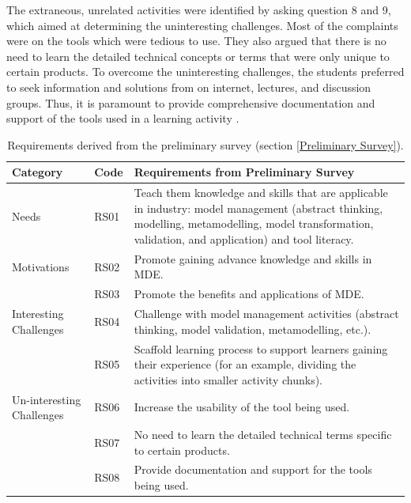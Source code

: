 \documentclass[12pt, a4paper]{report}
\begin{document}
The extraneous, unrelated activities were identified by asking question 8 and 9, which aimed at determining the uninteresting challenges. Most of the complaints were on the tools which were tedious to use. They also argued that there is no need to learn the detailed technical concepts or terms that were only unique to certain products. To overcome the uninteresting challenges, the students preferred to seek information and solutions from on internet, lectures, and discussion groups. Thus, it is paramount to provide comprehensive documentation and support of the tools used in a learning activity \cite{liebel2015ready}. 

\begin{table}[ht]
\caption{Requirements derived from the preliminary survey (section \ref{Preliminary Survey}).}
\label{table:preliminary-survey}
\begin{center}
\begin{tabular}{ p{2cm}p{1cm}p{10cm} } 
\hline
Category & Code & Requirements from Preliminary Survey \\
\hline
\multirow{1}{2cm}{Needs} 
& RS01 & Teach them knowledge and skills that are applicable in industry: model management (abstract thinking, modelling, metamodelling, model transformation, validation, and application) and tool literacy. \\ 
\hline
\multirow{1}{2cm}{Motivations}
& RS02 & Promote gaining advance knowledge and skills in MDE. \\ 
& RS03 & Promote the benefits and applications of MDE. \\ 
\hline
\multirow{1}{2cm}{Interesting Challenges}
& RS04 & Challenge with model management activities (abstract thinking, model validation, metamodelling, etc.). \\ 
& RS05 & Scaffold learning process to support learners gaining their experience (for an example, dividing the activities into smaller activity chunks). \\ 
\hline
\multirow{1}{2cm}{Un-interesting Challenges}
& RS06 & Increase the usability of the tool being used. \\ 
& RS07 & No need to learn the detailed technical terms specific to certain products. \\ 
& RS08 & Provide documentation and support for the tools being used. \\ 
\hline
\end{tabular}
\end{center}
\end{table}
\end{document}
